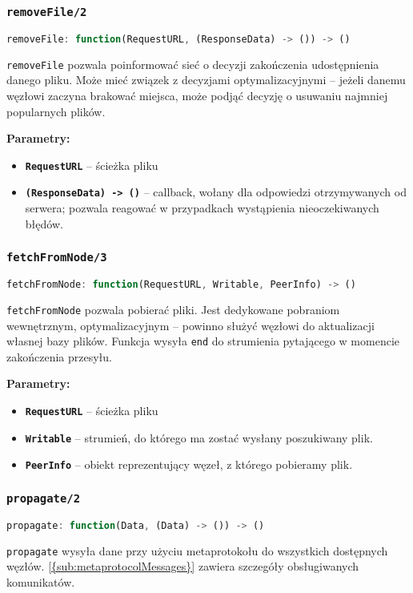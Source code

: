 % 

\subsubsection{\texttt{removeFile/2}}
\begin{lstlisting}[language=javascript]
    removeFile: function(RequestURL, (ResponseData) -> ()) -> ()
\end{lstlisting}
\texttt{removeFile} pozwala poinformować sieć o decyzji zakończenia udostępnienia danego pliku. Może mieć związek z decyzjami optymalizacyjnymi -- jeżeli danemu węzłowi zaczyna brakować miejsca, może podjąć decyzję o usuwaniu najmniej popularnych plików.

\textbf{Parametry:}
\begin{itemize}
    \item \textbf{\texttt{RequestURL}} -- ścieżka pliku
    \item \textbf{\texttt{(ResponseData) -> ()}} -- callback, wołany dla odpowiedzi otrzymywanych od serwera; pozwala reagować w przypadkach wystąpienia nieoczekiwanych błędów.
\end{itemize}

% 

\subsubsection{\texttt{fetchFromNode/3}}
\begin{lstlisting}[language=javascript]
    fetchFromNode: function(RequestURL, Writable, PeerInfo) -> ()
\end{lstlisting}
\texttt{fetchFromNode} pozwala pobierać pliki. Jest dedykowane pobraniom wewnętrznym, optymalizacyjnym -- powinno służyć węzłowi do aktualizacji własnej bazy plików. Funkcja wysyła \texttt{end} do strumienia pytającego w momencie zakończenia przesyłu.

\textbf{Parametry:}
\begin{itemize}
    \item \textbf{\texttt{RequestURL}} -- ścieżka pliku
    \item \textbf{\texttt{Writable}} -- strumień, do którego ma zostać wysłany poszukiwany plik.
    \item \textbf{\texttt{PeerInfo}} -- obiekt reprezentujący węzeł, z którego pobieramy plik.
\end{itemize}


% 

\subsubsection{\texttt{propagate/2}}
\begin{lstlisting}[language=javascript]
    propagate: function(Data, (Data) -> ()) -> ()
\end{lstlisting}
\texttt{propagate} wysyła dane przy użyciu metaprotokołu do wszystkich dostępnych węzłów. \ref{{sub:metaprotocolMessages}} zawiera szczegóły obsługiwanych komunikatów.

